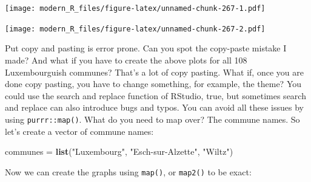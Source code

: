 \documentclass[]{gitbook}
\newenvironment{Shaded}{\begin{snugshade}}{\end{snugshade}}
\newcommand{\DataTypeTok}[1]{\textcolor[rgb]{0.13,0.29,0.53}{#1}}
\newcommand{\KeywordTok}[1]{\textcolor[rgb]{0.13,0.29,0.53}{\textbf{#1}}}
\newcommand{\NormalTok}[1]{#1}
\newcommand{\OperatorTok}[1]{\textcolor[rgb]{0.81,0.36,0.00}{\textbf{#1}}}
\newcommand{\StringTok}[1]{\textcolor[rgb]{0.31,0.60,0.02}{#1}}
\theoremstyle{definition}
\theoremstyle{definition}
\theoremstyle{definition}
\theoremstyle{remark}
\begin{document}
\texttt{[image: modern\_R\_files/figure-latex/unnamed-chunk-267-1.pdf]}

\begin{Shaded}
\end{Shaded}

\texttt{[image: modern\_R\_files/figure-latex/unnamed-chunk-267-2.pdf]}

Put copy and pasting is error prone. Can you spot the copy-paste mistake
I made? And what if you have to create the above plots for all 108
Luxembourguish communes? That's a lot of copy pasting. What if, once you
are done copy pasting, you have to change something, for example, the
theme? You could use the search and replace function of RStudio, true,
but sometimes search and replace can also introduce bugs and typos. You
can avoid all these issues by using \texttt{purrr::map()}. What do you
need to map over? The commune names. So let's create a vector of commune
names:

\begin{Shaded}
\begin{Highlighting}[]
\NormalTok{communes =}\StringTok{ }\KeywordTok{list}\NormalTok{(}\StringTok{"Luxembourg"}\NormalTok{, }\StringTok{"Esch-sur-Alzette"}\NormalTok{, }\StringTok{"Wiltz"}\NormalTok{)}
\end{Highlighting}
\end{Shaded}

Now we can create the graphs using \texttt{map()}, or \texttt{map2()} to
be exact:
\end{document}
